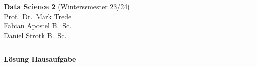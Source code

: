 \documentclass[12pt,pdftex]{scrartcl}
\begin{document}
\noindent
{\small{\textbf{Data Science 2}} (Wintersemester 23/24)\hfill \woche \\
Prof.~Dr.~Mark Trede\\
Fabian Apostel B.~Sc.\\
Daniel Stroth B.~Sc.}
\vspace{0.1cm}
\hrule

\vspace{0,5cm}
\begin{center}
{\Large{\textbf{Lösung Hausaufgabe \nr}}}\\[0.3cm] 
{\small{\textit{\thema}}}\\[1cm]
\end{center}

\end{document}
